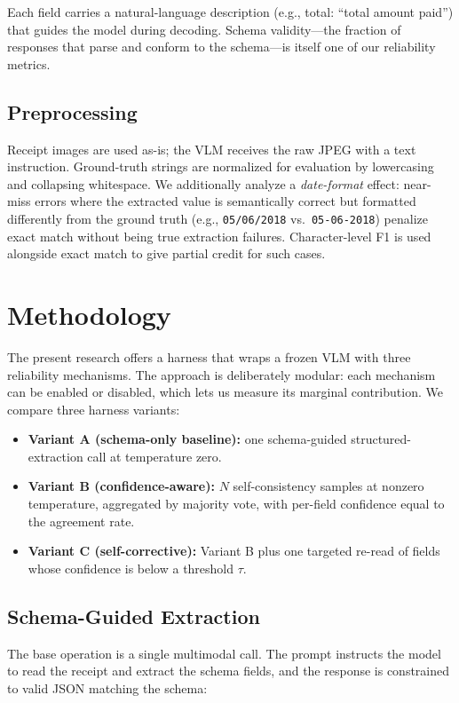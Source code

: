 \documentclass[conference]{IEEEtran}
\begin{document}
Each field carries a natural-language description (e.g., total: ``total amount paid'') that guides the model during decoding. Schema validity---the fraction of responses that parse and conform to the schema---is itself one of our reliability metrics.

\subsection{Preprocessing}
Receipt images are used as-is; the VLM receives the raw JPEG with a text instruction. Ground-truth strings are normalized for evaluation by lowercasing and collapsing whitespace. We additionally analyze a \emph{date-format} effect: near-miss errors where the extracted value is semantically correct but formatted differently from the ground truth (e.g., \texttt{05/06/2018} vs.\ \texttt{05-06-2018}) penalize exact match without being true extraction failures. Character-level F1 is used alongside exact match to give partial credit for such cases.

\section{Methodology}
\label{sec:method}

The present research offers a harness that wraps a frozen VLM with three reliability mechanisms. The approach is deliberately modular: each mechanism can be enabled or disabled, which lets us measure its marginal contribution. We compare three harness variants:

\begin{itemize}
    \item \textbf{Variant A (schema-only baseline):} one schema-guided structured-extraction call at temperature zero.
    \item \textbf{Variant B (confidence-aware):} \(N\) self-consistency samples at nonzero temperature, aggregated by majority vote, with per-field confidence equal to the agreement rate.
    \item \textbf{Variant C (self-corrective):} Variant B plus one targeted re-read of fields whose confidence is below a threshold \(\tau\).
\end{itemize}

\subsection{Schema-Guided Extraction}
The base operation is a single multimodal call. The prompt instructs the model to read the receipt and extract the schema fields, and the response is constrained to valid JSON matching the schema:
\end{document}
